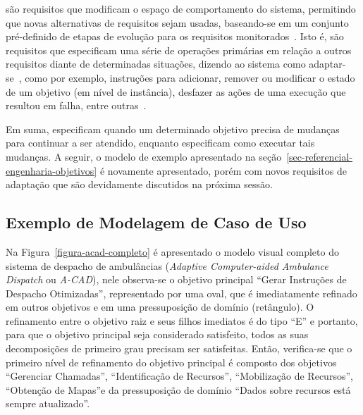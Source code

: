 \evoreqs são requisitos que modificam o espaço de comportamento do sistema, permitindo que novas alternativas de requisitos sejam usadas, baseando-se em um conjunto pré-definido de etapas de evolução para os requisitos monitorados~\cite{souza2012requirement}. Isto é, \evoreqs são requisitos que especificam uma série de operações primárias em relação a outros requisitos diante de determinadas situações, dizendo ao sistema como adaptar-se~\cite{souza2012requirement}, como por exemplo, instruções para adicionar, remover ou modificar o estado de um objetivo (em nível de instância), desfazer as ações de uma execução que resultou em falha, entre outras~\cite{souza2013requirements}.

Em suma, \awreqs especificam quando um determinado objetivo precisa de mudanças para continuar a ser atendido, enquanto \evoreqs especificam como executar tais mudanças. A seguir, o modelo de exemplo apresentado na seção~\ref{sec-referencial-engenharia-objetivos} é novamente apresentado, porém com novos requisitos de adaptação que são devidamente discutidos na próxima sessão.

\subsection{Exemplo de Modelagem de Caso de Uso}
\label{sec-referencial-engenharia-objetivos-exemplo}

Na Figura~\ref{figura-acad-completo} é apresentado o modelo visual completo do sistema de despacho de ambulâncias (\textit{Adaptive Computer-aided Ambulance Dispatch} ou \textit{A-CAD}), nele observa-se o objetivo principal ``Gerar Instruções de Despacho Otimizadas'', representado por uma oval, que é imediatamente refinado em outros objetivos e em uma pressuposição de domínio (retângulo). O refinamento entre o objetivo raiz e seus filhos imediatos é do tipo ``E'' e portanto, para que o objetivo principal seja considerado satisfeito, todos as suas decomposições de primeiro grau precisam ser satisfeitas. Então, verifica-se que o primeiro nível de refinamento do objetivo principal é composto dos objetivos ``Gerenciar Chamadas'', ``Identificação de Recursos'', ``Mobilização de Recursos'', ``Obtenção de Mapas''e da pressuposição de domínio ``Dados sobre recursos está sempre atualizado''.

